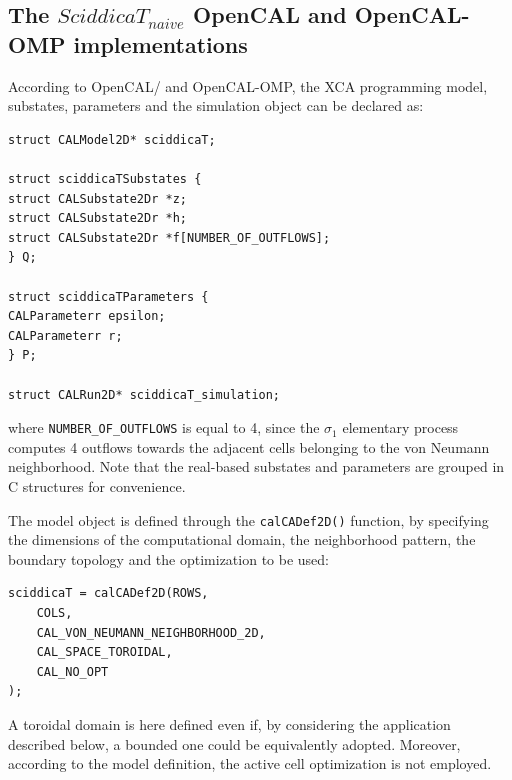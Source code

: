 \subsection{The $SciddicaT_{naive}$ OpenCAL and OpenCAL-OMP implementations}
According to OpenCAL/ and OpenCAL-OMP, the XCA programming model, substates,
parameters and the simulation object can be declared as:

\begin{lstlisting}
struct CALModel2D* sciddicaT;

struct sciddicaTSubstates {
struct CALSubstate2Dr *z;
struct CALSubstate2Dr *h;
struct CALSubstate2Dr *f[NUMBER_OF_OUTFLOWS];
} Q;

struct sciddicaTParameters {
CALParameterr epsilon;
CALParameterr r;
} P;

struct CALRun2D* sciddicaT_simulation;
\end{lstlisting}

\noindent where \verb'NUMBER_OF_OUTFLOWS' is equal to 4, since the
$\sigma_1$ elementary process computes 4 outflows towards the
adjacent cells belonging to the von Neumann neighborhood. Note that
the real-based substates and parameters are grouped in C structures
for convenience.

The model object is defined through the \verb'calCADef2D()'
function, by specifying the dimensions of the computational domain,
the neighborhood pattern, the boundary topology and the optimization
to be used:

\begin{lstlisting}
sciddicaT = calCADef2D(ROWS,
	COLS,
	CAL_VON_NEUMANN_NEIGHBORHOOD_2D,
	CAL_SPACE_TOROIDAL,
	CAL_NO_OPT
);
\end{lstlisting}

\noindent A toroidal domain is here defined even if, by considering
the application described below, a bounded one could be equivalently
adopted. Moreover, according to the model definition, the active
cell optimization is not employed.

